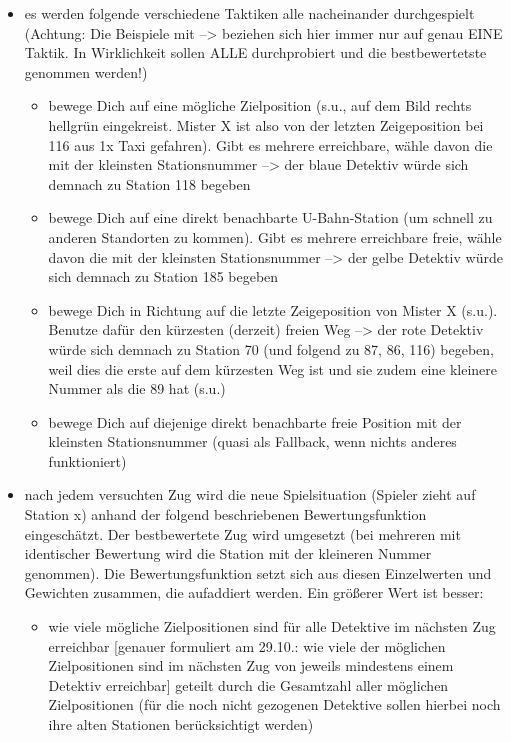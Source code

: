         \begin{itemize}
            \item es werden folgende verschiedene Taktiken alle nacheinander durchgespielt (Achtung: Die Beispiele mit --> beziehen sich hier immer nur auf genau EINE Taktik. In Wirklichkeit sollen ALLE durchprobiert und die bestbewertetste genommen werden!)
                \begin{itemize}
                    \item bewege Dich auf eine mögliche Zielposition (s.u., auf dem Bild rechts hellgrün eingekreist. Mister X ist also von der letzten Zeigeposition bei 116 aus 1x Taxi gefahren). Gibt es mehrere erreichbare, wähle davon die mit der kleinsten Stationsnummer --> der blaue Detektiv würde sich demnach zu Station 118 begeben
                    \item bewege Dich auf eine direkt benachbarte U-Bahn-Station (um schnell zu anderen Standorten zu kommen). Gibt es mehrere erreichbare freie, wähle davon die mit der kleinsten Stationsnummer --> der gelbe Detektiv würde sich demnach zu Station 185 begeben
                    \item bewege Dich in Richtung auf die letzte Zeigeposition von Mister X (s.u.). Benutze dafür den kürzesten (derzeit) freien Weg --> der rote Detektiv würde sich demnach zu Station 70 (und folgend zu 87, 86, 116) begeben, weil dies die erste auf dem kürzesten Weg ist und sie zudem eine kleinere Nummer als die 89 hat (s.u.)
                    \item bewege Dich auf diejenige direkt benachbarte freie Position mit der kleinsten Stationsnummer (quasi als Fallback, wenn nichts anderes funktioniert)
                \end{itemize}
            \item nach jedem versuchten Zug wird die neue Spielsituation (Spieler zieht auf Station x) anhand der folgend beschriebenen Bewertungsfunktion eingeschätzt. Der bestbewertete Zug wird umgesetzt (bei mehreren mit identischer Bewertung wird die Station mit der kleineren Nummer genommen). Die Bewertungsfunktion setzt sich aus diesen Einzelwerten und Gewichten zusammen, die aufaddiert werden. Ein größerer Wert ist besser:
                \begin{itemize}
                    \item wie viele mögliche Zielpositionen sind für alle Detektive im nächsten Zug erreichbar [genauer formuliert am 29.10.: wie viele der möglichen Zielpositionen sind im nächsten Zug von jeweils mindestens einem Detektiv erreichbar] geteilt durch die Gesamtzahl aller möglichen Zielpositionen (für die noch nicht gezogenen Detektive sollen hierbei noch ihre alten Stationen berücksichtigt werden)

\end{itemize}
\end{itemize}

